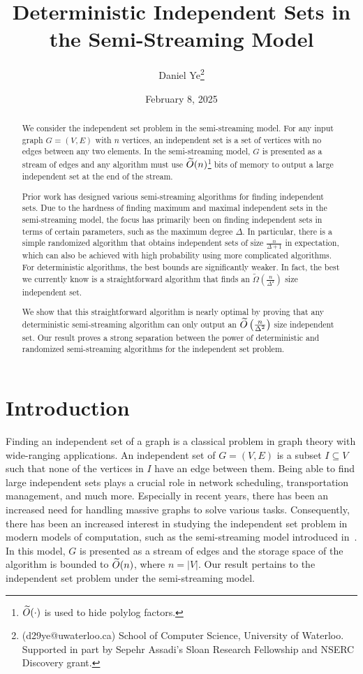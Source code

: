 \documentclass[11pt]{article}
\title{Deterministic Independent Sets in the Semi-Streaming Model}
\author{Daniel Ye\footnote{(d29ye@uwaterloo.ca) School of Computer Science, University of Waterloo. Supported in part by Sepehr Assadi’s Sloan Research Fellowship and NSERC Discovery grant.}}
\date{February 8, 2025}
\begin{document}
\maketitle

\begin{abstract}
We consider the independent set problem in the semi-streaming model. For any input graph $G=(V, E)$ with $n$ vertices, an independent set is a set of vertices with no edges between any two elements. In the semi-streaming model, $G$ is presented as a stream of edges and any algorithm must use $\widetilde{O}(n)$\footnote{$\widetilde{O}(\cdot)$ is used to hide polylog factors.} bits of memory to output a large independent set at the end of the stream.

\smallskip
Prior work has designed various semi-streaming algorithms for finding independent sets. Due to the hardness of finding maximum and maximal independent sets in the semi-streaming model, the focus has primarily been on finding independent sets in terms of certain parameters, such as the maximum degree $\Delta$. In particular, there is a simple randomized algorithm that obtains independent sets of size $\frac n{\Delta+1}$ in expectation, which can also be achieved with high probability using more complicated algorithms. For deterministic algorithms, the best bounds are significantly weaker. In fact, the best we currently know is a straightforward algorithm that finds an $\tilde\Omega\left(\frac n{\Delta^2}\right)$ size independent set.

\smallskip
We show that this straightforward algorithm is nearly optimal by proving that any deterministic semi-streaming algorithm can only output an $\widetilde{O}\left(\frac n{\Delta^2}\right)$ size independent set. Our result proves a strong separation between the power of deterministic and randomized semi-streaming algorithms for the independent set problem.
\end{abstract}

\newpage
\section{Introduction}
Finding an independent set of a graph is a classical problem in graph theory with wide-ranging applications. An independent set of $G=(V, E)$ is a subset $I\subseteq V$ such that none of the vertices in $I$ have an edge between them. Being able to find large independent sets plays a crucial role in network scheduling, transportation management, and much more. Especially in recent years, there has been an increased need for handling massive graphs to solve various tasks. Consequently, there has been an increased interest in studying the independent set problem in modern models of computation, such as the semi-streaming model introduced in~\cite{feigenbaum2005graph}. In this model, $G$ is presented as a stream of edges and the storage space of the algorithm is bounded to $\widetilde{O}(n)$, where $n=|V|$. Our result pertains to the independent set problem under the semi-streaming model. 
\vspace{-0.05cm}
\end{document}
